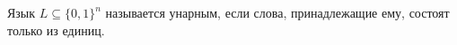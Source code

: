 Язык $L \subseteq \{0, 1\}^n$ называется унарным, если слова, принадлежащие ему, состоят только из единиц.
